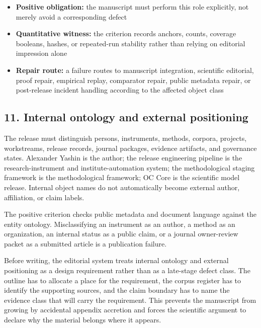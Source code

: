 \begin{itemize}[leftmargin=1.8em]

\item \textbf{Positive obligation:} the manuscript must perform this role explicitly, not merely avoid a corresponding defect

\item \textbf{Quantitative witness:} the criterion records anchors, counts, coverage booleans, hashes, or repeated-run stability rather than relying on editorial impression alone

\item \textbf{Repair route:} a failure routes to manuscript integration, scientific editorial, proof repair, empirical replay, comparator repair, public metadata repair, or post-release incident handling according to the affected object class

\end{itemize}

\subsection{11. Internal ontology and external positioning}

The release must distinguish persons, instruments, methods, corpora, projects, workstreams, release records, journal packages, evidence artifacts, and governance states. Alexander Yashin is the author; the release engineering pipeline is the research-instrument and institute-automation system; the methodological staging framework is the methodological framework; OC Core is the scientific model release. Internal object names do not automatically become external author, affiliation, or claim labels.


The positive criterion checks public metadata and document language against the entity ontology. Misclassifying an instrument as an author, a method as an organization, an internal status as a public claim, or a journal owner-review packet as a submitted article is a publication failure.


Before writing, the editorial system treats internal ontology and external positioning as a design requirement rather than as a late-stage defect class. The outline has to allocate a place for the requirement, the corpus register has to identify the supporting sources, and the claim boundary has to name the evidence class that will carry the requirement. This prevents the manuscript from growing by accidental appendix accretion and forces the scientific argument to declare why the material belongs where it appears.


